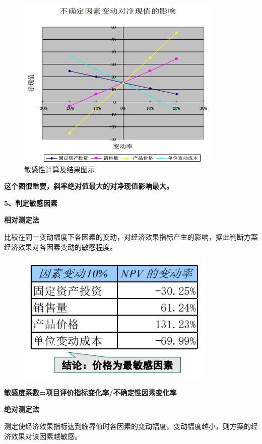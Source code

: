 \begin{figure}[H]
    \centering
    \includegraphics[width=0.8\linewidth]{image/敏感性计算及结果图示.png}
    \caption{敏感性计算及结果图示}
\end{figure}

\textbf{这个图很重要，斜率绝对值最大的对净现值影响最大。}

\textbf{5、判定敏感因素}

\noindent \textbf{相对测定法}

比较在同一变动幅度下各因素的变动，对经济效果指标产生的影响，据此判断方案经济效果对各因素变动的敏感程度。

\begin{figure}[H]
    \centering
    \includegraphics[width=0.75\linewidth]{image/相对测定法.png}
\end{figure}

\textbf{敏感度系数=项目评价指标变化率/不确定性因素变化率}

\noindent \textbf{绝对测定法}

测定使经济效果指标达到临界值时各因素的变动幅度，变动幅度越小，则方案的经济效果对该因素越敏感。

